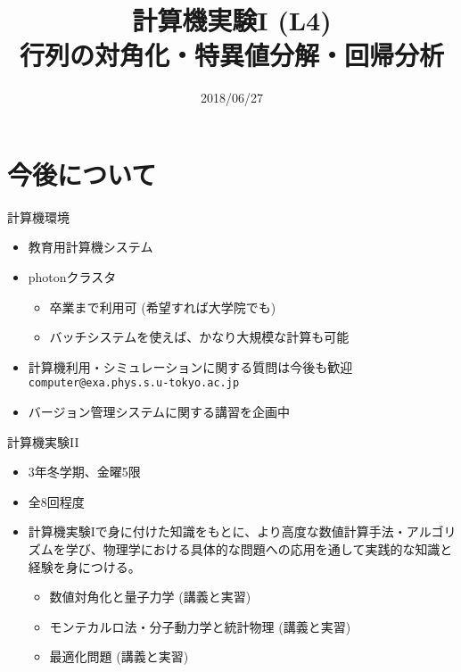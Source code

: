 \documentclass[dvipdfmx]{beamer}
\title{計算機実験I (L4) \\ 行列の対角化・特異値分解・回帰分析}
\date{2018/06/27}
\begin{document}
\begin{frame}
  \titlepage
  \tableofcontents
\end{frame}







\section{今後について}

\begin{frame}[t,fragile]{計算機環境}
  \begin{itemize}
    \setlength{\itemsep}{1em}
  \item 教育用計算機システム
  \item photonクラスタ
    \begin{itemize}
    \item 卒業まで利用可 (希望すれば大学院でも)
    \item バッチシステムを使えば、かなり大規模な計算も可能
    \end{itemize}
  \item 計算機利用・シミュレーションに関する質問は今後も歓迎 {\tt computer@exa.phys.s.u-tokyo.ac.jp}
  \item バージョン管理システムに関する講習を企画中
  \end{itemize}
\end{frame}

\begin{frame}[t,fragile]{計算機実験II}
  \begin{itemize}
    \setlength{\itemsep}{1em}
  \item 3年冬学期、金曜5限
  \item 全8回程度
  \item 計算機実験Iで身に付けた知識をもとに、より高度な数値計算手法・アルゴリズムを学び、物理学における具体的な問題への応用を通して実践的な知識と経験を身につける。
    \begin{itemize}
      \item 数値対角化と量子力学 (講義と実習)
      \item モンテカルロ法・分子動力学と統計物理 (講義と実習)
      \item 最適化問題 (講義と実習)
    \end{itemize}
  \end{itemize}
\end{frame}
\end{document}
